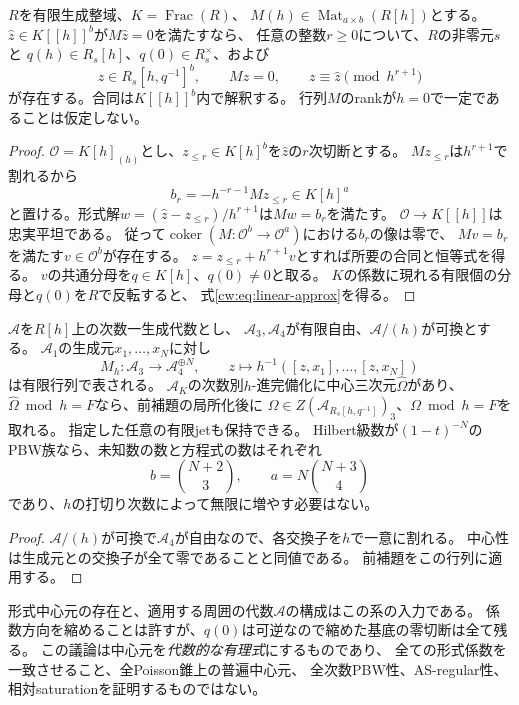 \begin{lemma}[genericな形式解の有限jetを保つ代数化]
\label{cw:lem:linear-algebraization}
$R$を有限生成整域、$K=\operatorname{Frac}(R)$、
$M(h)\in\operatorname{Mat}_{a\times b}(R[h])$とする。
$\widehat z\in K[[h]]^b$が$M\widehat z=0$を満たすなら、
任意の整数$r\ge0$について、$R$の非零元$s$と
$q(h)\in R_s[h]$、$q(0)\in R_s^\times$、および
\[
 z\in R_s[h,q^{-1}]^b,
 \qquad Mz=0,\qquad z\equiv\widehat z\pmod {h^{r+1}}
 \tag{L}\label{cw:eq:linear-approx}
\]
が存在する。合同は$K[[h]]^b$内で解釈する。
行列$M$のrankが$h=0$で一定であることは仮定しない。
\end{lemma}
\begin{proof}
$\mathcal O=K[h]_{(h)}$とし、$z_{\le r}\in K[h]^b$を$\widehat z$の$r$次切断とする。
$Mz_{\le r}$は$h^{r+1}$で割れるから
\[
 b_r=-h^{-r-1}Mz_{\le r}\in K[h]^a
\]
と置ける。形式解$w=(\widehat z-z_{\le r})/h^{r+1}$は$Mw=b_r$を満たす。
$\mathcal O\to K[[h]]$は忠実平坦である\cite[Tag 00MC]{Stacks}。
従って$\operatorname{coker}(M:\mathcal O^b\to\mathcal O^a)$における$b_r$の像は零で、
$Mv=b_r$を満たす$v\in\mathcal O^b$が存在する。
$z=z_{\le r}+h^{r+1}v$とすれば所要の合同と恒等式を得る。
$v$の共通分母を$q\in K[h]$、$q(0)\ne0$と取る。
$K$の係数に現れる有限個の分母と$q(0)$を$R$で反転すると、
式\eqref{cw:eq:linear-approx}を得る。
\end{proof}

\begin{corollary}[次数三の中心持上げの一様化]
\label{cw:cor:center-algebraization}
$\mathcal A$を$R[h]$上の次数一生成代数とし、
$\mathcal A_3,\mathcal A_4$が有限自由、$\mathcal A/(h)$が可換とする。
$\mathcal A_1$の生成元$x_1,\ldots,x_N$に対し
\[
 M_h:\mathcal A_3\longrightarrow\mathcal A_4^{\oplus N},
 \qquad z\longmapsto h^{-1}([z,x_1],\ldots,[z,x_N])
 \tag{Z}\label{cw:eq:center-matrix}
\]
は有限行列で表される。
$\mathcal A_K$の次数別$h$-進完備化に中心三次元$\widehat\Omega$があり、
$\widehat\Omega\bmod h=F$なら、前補題の局所化後に
$\Omega\in Z(\mathcal A_{R_s[h,q^{-1}]})_3$、$\Omega\bmod h=F$を取れる。
指定した任意の有限jetも保持できる。
Hilbert級数が$(1-t)^{-N}$のPBW族なら、未知数の数と方程式の数はそれぞれ
\[
 b=\binom{N+2}{3},\qquad a=N\binom{N+3}{4}
\]
であり、$h$の打切り次数によって無限に増やす必要はない。
\end{corollary}
\begin{proof}
$\mathcal A/(h)$が可換で$\mathcal A_4$が自由なので、各交換子を$h$で一意に割れる。
中心性は生成元との交換子が全て零であることと同値である。
前補題をこの行列に適用する。
\end{proof}
\begin{remark}[この代数化が証明しないこと]
\label{cw:rem:center-limit}
形式中心元の存在と、適用する周囲の代数$\mathcal A$の構成はこの系の入力である。
係数方向を縮めることは許すが、$q(0)$は可逆なので縮めた基底の零切断は全て残る。
この議論は中心元を\emph{代数的な有理式}にするものであり、
全ての形式係数を一致させること、全Poisson錐上の普遍中心元、
全次数PBW性、AS-regular性、相対saturationを証明するものではない。
\end{remark}

